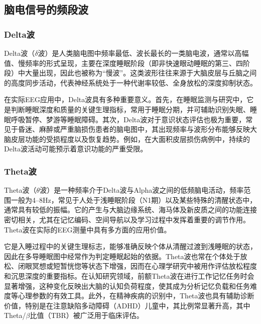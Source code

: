 \documentclass{ctexart}
\begin{document}
	\subsection{脑电信号的频段波}
		\subsubsection{Delta波}
			Delta波（$\delta$波）是人类脑电图中频率最低、波长最长的一类脑电波，通常以高幅值、慢频率的形式呈现，主要在深度睡眠阶段（即非快速眼动睡眠的第三、四阶段）中大量出现，因此也被称为“慢波”。这类波形往往来源于大脑皮层与丘脑之间的高度同步活动，代表神经系统处于一种代谢率较低、全身放松的深度抑制状态。\par
			在实际EEG应用中，Delta波具有多种重要意义。首先，在睡眠监测与研究中，它是判断睡眠深度和质量的关键生理指标，常用于睡眠分期，并可辅助识别失眠、睡眠呼吸暂停、梦游等睡眠障碍。其次，Delta波对于意识状态评估也极为重要，常见于昏迷、麻醉或严重脑损伤患者的脑电图中，其出现频率与波形分布能够反映大脑皮层功能的受损程度以及恢复趋势。例如，在大面积皮层损伤病例中，持续的Delta波活动可能预示着意识功能的严重受限。\cite{基于脑电和眼电的疲劳检测方法的研究}
		\subsubsection{Theta波}
			Theta波（$\theta$波）是一种频率介于Delta波与Alpha波之间的低频脑电活动，频率范围一般为4–8Hz，常见于人处于浅睡眠阶段（N1期）以及某些特殊的清醒状态中，通常具有较低的振幅。它的产生与大脑边缘系统、海马体及新皮质之间的功能连接密切相关，尤其在记忆编码、空间导航以及学习过程中发挥着重要的调节作用。Theta波在实际的EEG测量中具有多方面的应用价值。\par
			它是入睡过程中的关键生理标志，能够准确反映个体从清醒过渡到浅睡眠的状态，因此在多导睡眠图中经常作为判定睡眠起始的依据。Theta波也常在个体处于放松、闭眼冥想或短暂恍惚等状态下增强，因而在心理学研究中被用作评估放松程度和沉思深度的重要指标。在认知研究领域，前额Theta波在进行工作记忆任务时会显著增强，这种变化反映出大脑的认知负荷程度，使其成为分析记忆负载和任务难度等心理参数的有效工具。此外，在精神疾病的识别中，Theta波也具有辅助诊断价值，特别是在注意缺陷多动障碍（ADHD）儿童中，其比例常显著升高，其中Theta/$\beta$比值（TBR）被广泛用于临床评估\cite{基于脑电(EEG)的椅式按摩位置对按摩舒适性影响的研究}。
\end{document}
